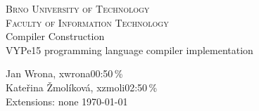 \begin{titlepage}
\begin{center}
\textsc{{\LARGE Brno University of Technology}\\
\smallskip
{\Large Faculty of Information Technology}}\\
{\LARGE Compiler Construction}\\
\medskip
{\Huge VYPe15 programming language compiler implementation}\\
\end{center}
{\Large Jan Wrona, xwrona00:50\,\%}\\
{\Large Kateřina Žmolíková, xzmoli02:50\,\%}\\
{\Large Extensions: none \hfill \today}
\end{titlepage}